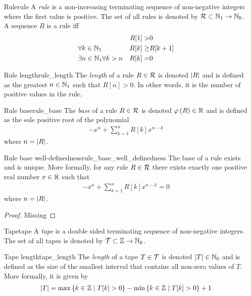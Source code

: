 \documentclass[../main.tex]{subfiles}
\begin{document}
\begin{definition}{Rule}{rule}
    A \emph{rule} is a non-increasing terminating sequence of non-negative integers where the first value is positive.
    The set of all rules is denoted by $\mathcal{R}\subset\mathbb{N}_1\to\mathbb{N}_0$.
    A sequence $R$ is a rule iff
    \begin{align*}
        &&R[1]>&0\\
        &\forall k\in\mathbb{N}_1&R[k]\geq&R[k+1]\\
        &\exists n\in\mathbb{N}_1\forall k> n&R[k]=&0
    \end{align*}
\end{definition}

\begin{definition}{Rule length}{rule_length}
    The \emph{length} of a rule $R\in\mathcal{R}$ is denoted $\left\lvert R\right\rvert$ and is defined as the greatest $n\in\mathbb{N}_1$ such that $R[n]>0$.
    In other words, it is the number of positive values in the rule.
\end{definition}

\begin{definition}{Rule base}{rule_base}
    The \emph{base} of a rule $R\in\mathcal{R}$ is denoted $\varphi\left(R\right)\in\mathbb{R}$ and is defined as the sole positive root of the polynomial
    \begin{align*}
        -x^n+\sum_{k=1}^nR[k]x^{n-k}
    \end{align*}
    where $n=\left\lvert R\right\rvert$.
\end{definition}

\begin{theorem}{Rule base well-definedness}{rule_base_well_definedness}
    The base of a rule exists and is unique.
    More formally, for any rule $R\in\mathcal{R}$ there exists exactly one positive real number $x\in\mathbb{R}$ such that
    \begin{align*}
        -x^n+\sum_{k=1}^nR[k]x^{n-k}=0
    \end{align*}
    where $n=\left\lvert R\right\rvert$.
\end{theorem}
\begin{proof}
    Missing
\end{proof}

\begin{definition}{Tape}{tape}
    A \emph{tape} is a double sided terminating sequence of non-negative integers.
    The set of all tapes is denoted by $\mathcal{T}\subset\mathbb{Z}\to\mathbb{N}_0$.
\end{definition}

\begin{definition}{Tape length}{tape_length}
    The \emph{length} of a tape $T\in\mathcal{T}$ is denoted $\left\lvert T\right\rvert\in\mathbb{N}_0$ and is defined as the size of the smallest interval that contains all non-zero values of $T$.
    More formally, it is given by
    \begin{align*}
        \left\lvert T\right\rvert=\max\left\{k\in\mathbb{Z}\mid T[k]>0\right\}-\min\left\{k\in\mathbb{Z}\mid T[k]>0\right\} + 1
    \end{align*}
\end{definition}
\end{document}
